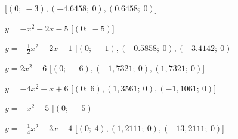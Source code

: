 \begin{esercizio}
\begin{enumeratea}
   \hfill [\(\left (0;~-3 \right ), 
            \left(-4.6458;~0 \right), \left(0.6458;~0 \right)\)]
  \item  \(y=- x^2 -2 x -5\)
   \hfill [\(\left (0;~-5 \right )\)]
  \item  \(y=-\frac{1}{2} x^2 -2 x -1\)
   \hfill [\(\left (0;~-1 \right ), 
            \left(-0.5858;~0 \right), \left(-3.4142;~0 \right)\)]
  \item  \(y=2 x^2 -6\)
   \hfill [\(\left (0;~-6 \right ), 
            \left(-1,7321;~0 \right), \left(1,7321;~0 \right)\)]
  \item  \(y=-4 x^2 + x +6\)
   \hfill [\(\left (0;~6 \right ), 
            \left(1,3561;~0 \right), \left(-1,1061;~0 \right)\)]
  \item  \(y=- x^2 -5\)
   \hfill [\(\left (0;~-5 \right )\)]
  \item  \(y=-\frac{1}{4} x^2 -3 x +4\)
   \hfill [\(\left (0;~4 \right ), 
            \left(1,2111;~0 \right), \left(-13,2111;~0 \right)\)]
 \end{enumeratea}
\end{esercizio}

